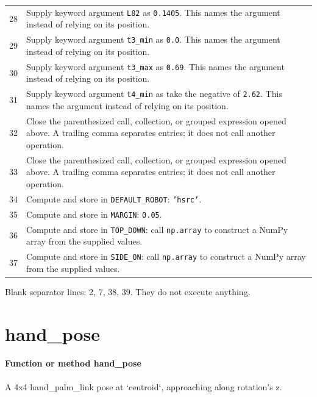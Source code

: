 \documentclass[11pt,a4paper]{book}
\begin{document}
\begin{longtable}{r p{}}
28 & Supply keyword argument \texttt{L82} as \texttt{0.1405}. This names the argument instead of relying on its position. \\

29 & Supply keyword argument \texttt{t3\_min} as \texttt{0.0}. This names the argument instead of relying on its position. \\

30 & Supply keyword argument \texttt{t3\_max} as \texttt{0.69}. This names the argument instead of relying on its position. \\

31 & Supply keyword argument \texttt{t4\_min} as take the negative of \texttt{2.62}. This names the argument instead of relying on its position. \\

32 & Close the parenthesized call, collection, or grouped expression opened above. A trailing comma separates entries; it does not call another operation. \\

33 & Close the parenthesized call, collection, or grouped expression opened above. A trailing comma separates entries; it does not call another operation. \\

34 & Compute and store in \texttt{DEFAULT\_ROBOT}: \texttt{'hsrc'}.  \\

35 & Compute and store in \texttt{MARGIN}: \texttt{0.05}.  \\

36 & Compute and store in \texttt{TOP\_DOWN}: call \texttt{np.array} to construct a NumPy array from the supplied values.  \\

37 & Compute and store in \texttt{SIDE\_ON}: call \texttt{np.array} to construct a NumPy array from the supplied values.  \\

\end{longtable}

Blank separator lines: 2, 7, 38, 39. They do not execute anything.

\section{hand\_pose}

\paragraph{Function or method hand\_pose}
A 4x4 hand\_palm\_link pose at `centroid`, approaching along rotation's z.
\end{document}
